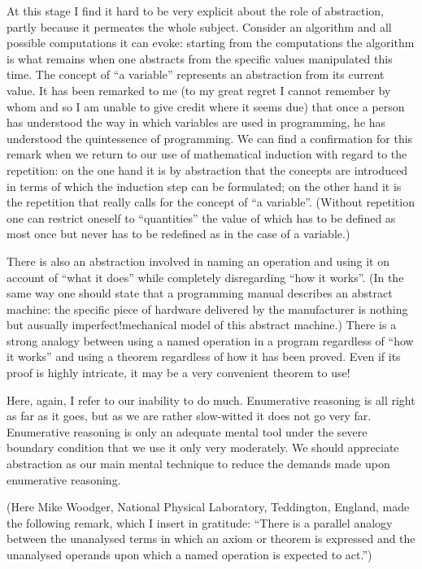 \documentclass[twoside,11pt]{book}
\begin{document}
At this stage I find it hard to be very explicit about the role of abstraction, partly because it permeates the whole subject. Consider an algorithm and all possible computations it can evoke: starting from the computations the algorithm is what remains when one abstracts from the specific values manipulated this time. The concept of ``a variable'' represents an abstraction from its current value. It has been remarked to me (to my great regret I cannot remember by whom and so I am unable to give credit where it seems due) that once a person has understood the way in which variables are used in programming, he has understood the quintessence of programming. We can find a confirmation for this remark when we return to our use of mathematical induction with regard to the repetition: on the one hand it is by abstraction that the concepts are introduced in terms of which the induction step can be formulated; on the other hand it is the repetition that really calls for the concept of ``a variable''. (Without repetition one can restrict oneself to ``quantities'' the value of which has to be defined as most once but never has to be redefined as in the case of a variable.)

There is also an abstraction involved in naming an operation and using it on account of ``what it does'' while completely disregarding ``how it works''. (In the same way one should state that a programming manual describes an abstract machine: the specific piece of hardware delivered by the manufacturer is nothing but a\textemdash{}usually imperfect!\textemdash{}mechanical model of this abstract machine.) There is a strong analogy between using a named operation in a program regardless of ``how it works'' and using a theorem regardless of how it has been proved. Even if its proof is highly intricate, it may be a very convenient theorem to use!

Here, again, I refer to our inability to do much. Enumerative reasoning is all right as far as it goes, but as we are rather slow-witted it does not go very
far. Enumerative reasoning is only an adequate mental tool under the severe boundary condition that we use it only very moderately. We should appreciate
abstraction as our main mental technique to reduce the demands made upon enumerative reasoning.

(Here Mike Woodger, National Physical Laboratory, Teddington, England, made the following remark, which I insert in gratitude: ``There is a parallel analogy between the unanalysed terms in which an axiom or theorem is expressed and the unanalysed operands upon which a named operation is expected to act.'')
\end{document}
